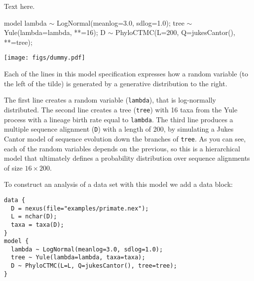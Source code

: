 \documentclass[oneside]{article}
\begin{document}
\begin{tcolorbox}[breakable, width=\textwidth, colback=gray!10, boxrule=0pt,
  title=Box 1: A simple molecular phylogenetic model, fonttitle=\bfseries]
  \small 
  Text here.

  \hspace{-1cm}
  \begin{minipage}[b]{0.7\textwidth}
    {\singlespacing
      \begin{lphylisting}
        model {
          lambda $\sim$ LogNormal(meanlog=3.0, sdlog=1.0);
          tree $\sim$ Yule(lambda=lambda, *\color{grayargs}{n}*=16);
          D $\sim$ PhyloCTMC(L=200, Q=jukesCantor(),
          *\color{grayargs}{tree}*=tree);
        }
      \end{lphylisting}
    }
  \end{minipage}
  \begin{minipage}[b]{0.3\textwidth}
    \texttt{[image: figs/dummy.pdf]}
  \end{minipage}


\end{tcolorbox}
Each of the lines in this model specification expresses how a random
variable (to the left of the tilde) is generated by a generative
distribution to the right. 

The first line creates a random variable (\texttt{lambda}), that is
log-normally distributed.
The second line creates a tree (\texttt{tree}) with 16 taxa from the
Yule process with a lineage birth rate equal to \texttt{lambda}.
The third line produces a multiple sequence alignment (\texttt{D})
with a length of 200, by simulating a Jukes Cantor model of sequence
evolution down the branches of  \texttt{tree}.
As you can see, each of the random variables depends on the previous,
so this is a hierarchical model that ultimately defines a probability
distribution over sequence alignments of size $16 \times 200$.

To construct an analysis of a data set with this model we add a data block:

{\singlespacing
\begin{verbatim}
data {
  D = nexus(file="examples/primate.nex");
  L = nchar(D);
  taxa = taxa(D);
}
model {
  lambda ~ LogNormal(meanlog=3.0, sdlog=1.0);
  tree ~ Yule(lambda=lambda, taxa=taxa);
  D ~ PhyloCTMC(L=L, Q=jukesCantor(), tree=tree);
}
\end{verbatim}
}
\end{document}
